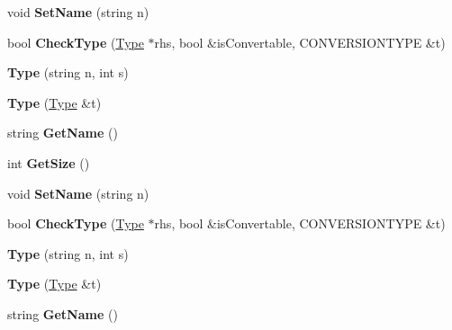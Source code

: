 \begin{DoxyCompactItemize}
\item 
\hypertarget{classType_ab8d2328a3a76289edf42b9bf0d4f278f}{void {\bfseries Set\-Name} (string n)}\label{classType_ab8d2328a3a76289edf42b9bf0d4f278f}

\item 
\hypertarget{classType_a2574b17ddc03d5ca13309811d06f1a56}{bool {\bfseries Check\-Type} (\hyperlink{classType}{Type} $\ast$rhs, bool \&is\-Convertable, C\-O\-N\-V\-E\-R\-S\-I\-O\-N\-T\-Y\-P\-E \&t)}\label{classType_a2574b17ddc03d5ca13309811d06f1a56}

\item 
\hypertarget{classType_a0ec88e19865012d53e20b97677218783}{{\bfseries Type} (string n, int s)}\label{classType_a0ec88e19865012d53e20b97677218783}

\item 
\hypertarget{classType_a617481e51492ea14507c83d5dba2cce5}{{\bfseries Type} (\hyperlink{classType}{Type} \&t)}\label{classType_a617481e51492ea14507c83d5dba2cce5}

\item 
\hypertarget{classType_a8143fe4686ae1a5709a5955396c6ee26}{string {\bfseries Get\-Name} ()}\label{classType_a8143fe4686ae1a5709a5955396c6ee26}

\item 
\hypertarget{classType_afe0fca035825759785b525d2a24f69fe}{int {\bfseries Get\-Size} ()}\label{classType_afe0fca035825759785b525d2a24f69fe}

\item 
\hypertarget{classType_ab8d2328a3a76289edf42b9bf0d4f278f}{void {\bfseries Set\-Name} (string n)}\label{classType_ab8d2328a3a76289edf42b9bf0d4f278f}

\item 
\hypertarget{classType_a2574b17ddc03d5ca13309811d06f1a56}{bool {\bfseries Check\-Type} (\hyperlink{classType}{Type} $\ast$rhs, bool \&is\-Convertable, C\-O\-N\-V\-E\-R\-S\-I\-O\-N\-T\-Y\-P\-E \&t)}\label{classType_a2574b17ddc03d5ca13309811d06f1a56}

\item 
\hypertarget{classType_a0ec88e19865012d53e20b97677218783}{{\bfseries Type} (string n, int s)}\label{classType_a0ec88e19865012d53e20b97677218783}

\item 
\hypertarget{classType_a617481e51492ea14507c83d5dba2cce5}{{\bfseries Type} (\hyperlink{classType}{Type} \&t)}\label{classType_a617481e51492ea14507c83d5dba2cce5}

\item 
\hypertarget{classType_a8143fe4686ae1a5709a5955396c6ee26}{string {\bfseries Get\-Name} ()}\label{classType_a8143fe4686ae1a5709a5955396c6ee26}


\end{DoxyCompactItemize}
